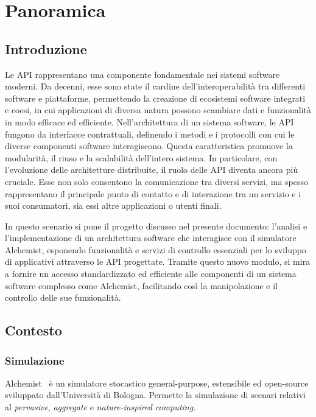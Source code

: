 \chapter{Panoramica}\label{chap:introduction}
\section{Introduzione}\label{sec:background}
Le \ac{API} rappresentano una componente fondamentale nei sistemi software moderni. Da decenni, esse sono state il cardine dell'interoperabilità tra differenti software e piattaforme, permettendo la
creazione di ecosistemi software integrati e coesi, in cui applicazioni di diversa natura possono scambiare dati e funzionalità in modo efficace ed efficiente.
Nell'architettura di un sistema software, le \ac{API} fungono da interfacce contrattuali, definendo i metodi e i protocolli con cui le diverse componenti
software interagiscono. Questa caratteristica promuove la modularità, il riuso e la scalabilità dell'intero sistema. In particolare, con l'evoluzione delle
architetture distribuite, il ruolo delle \ac{API} diventa ancora più cruciale. Esse non solo consentono la comunicazione tra diversi servizi, ma spesso rappresentano il principale punto di
contatto e di interazione tra un servizio e i suoi consumatori, sia essi altre applicazioni o utenti finali.

In questo scenario si pone il progetto discusso nel presente documento: l'analisi e l'implementazione di un architettura software che interagisce con il simulatore Alchemist, esponendo funzionalità e
servizi di controllo essenziali per lo sviluppo di applicativi attraverso le API progettate.
Tramite questo nuovo modulo, si mira a fornire un accesso standardizzato ed efficiente alle componenti di un sistema software complesso come Alchemist, facilitando così la manipolazione e il controllo
delle sue funzionalità.

\section{Contesto}\label{sec:context}
\subsection{Simulazione}\label{ssec:alchemist}
Alchemist~\cite{alchemist} è un simulatore stocastico general-purpose, estensibile ed open-source sviluppato dall'Università di Bologna. Permette la simulazione di scenari relativi al
\textit{pervasive}, \textit{aggregate} e \textit{nature-inspired computing}.

